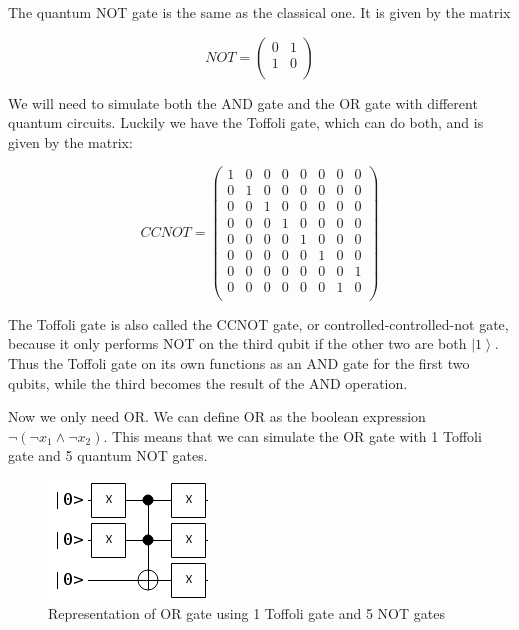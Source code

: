 \documentclass[11pt]{article}
\begin{document}
The quantum NOT gate is the same as the classical one. It is given by the matrix

$$NOT= \begin{pmatrix}
0 & 1 \\
1 & 0 \\
\end{pmatrix}$$

We will need to simulate both the AND gate and the OR gate with different quantum circuits. Luckily we have the Toffoli gate, which can do both, and is given by the matrix:

$$CCNOT= \begin{pmatrix}
1 & 0 & 0 & 0 & 0 & 0 & 0 & 0 \\
0 & 1 & 0 & 0 & 0 & 0 & 0 & 0 \\
0 & 0 & 1 & 0 & 0 & 0 & 0 & 0 \\
0 & 0 & 0 & 1 & 0 & 0 & 0 & 0 \\
0 & 0 & 0 & 0 & 1 & 0 & 0 & 0 \\
0 & 0 & 0 & 0 & 0 & 1 & 0 & 0 \\
0 & 0 & 0 & 0 & 0 & 0 & 0 & 1 \\
0 & 0 & 0 & 0 & 0 & 0 & 1 & 0 \\
\end{pmatrix}$$

The Toffoli gate is also called the CCNOT gate, or controlled-controlled-not gate, because it only performs NOT on the third qubit if the other two are both $\left | 1 \right \rangle$. Thus the Toffoli gate on its own functions as an AND gate for the first two qubits, while the third becomes the result of the AND operation.

Now we only need OR. We can define OR as the boolean expression $\neg (\neg x_{1} \land \neg x_{2})$. This means that we can simulate the OR gate with 1 Toffoli gate and 5 quantum NOT gates.

\begin{figure}[!ht]
    \centering
    \includegraphics[scale=0.6]{OR.png}
    \caption{Representation of OR gate using 1 Toffoli gate and 5 NOT gates}
    \label{fig:awesome_image}
\end{figure} 
\end{document}
